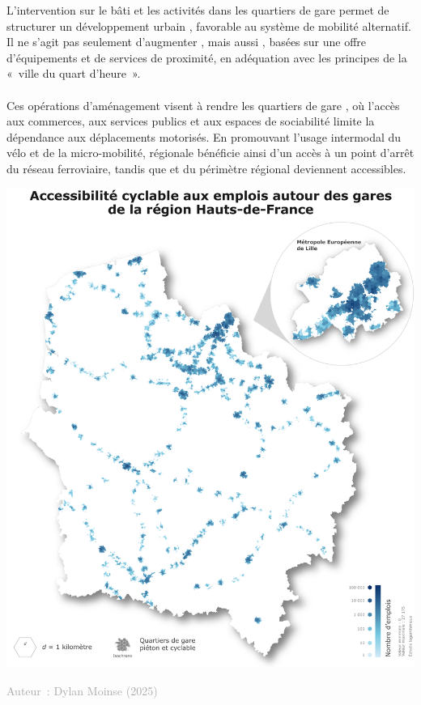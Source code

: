 \documentclass[../main.tex]{subfiles}
\begin{document}
    \begin{multicols}{2}
    \raggedcolumns
    \small{
L’intervention sur le bâti et les activités dans les quartiers de gare permet de structurer un développement urbain , favorable au système de mobilité alternatif. Il ne s’agit pas seulement d’augmenter , mais aussi , basées sur une offre d'équipements et de services de proximité, en adéquation avec les principes de la «~ville du quart d'heure~».
    \\\\
Ces opérations d'aménagement visent à rendre les quartiers de gare , où l’accès aux commerces, aux services publics et aux espaces de sociabilité limite la dépendance aux déplacements motorisés. En promouvant l'usage intermodal du vélo et de la micro-mobilité,  régionale bénéficie ainsi d'un accès à un point d'arrêt du réseau ferroviaire, tandis que  et  du périmètre régional deviennent accessibles.
    }
\begin{center}
    \includegraphics[width=\columnwidth]{figures/policy-brief-carte-emplois-compresse.pdf}
    \label{acces-emplois}
    \vspace{-0.5cm}
    \begin{flushright}
            \scriptsize{\textcolor{darkgray}{Auteur~: Dylan Moinse (2025)}}
    \end{flushright}
\end{center}

    \end{multicols}

    
\end{document}
